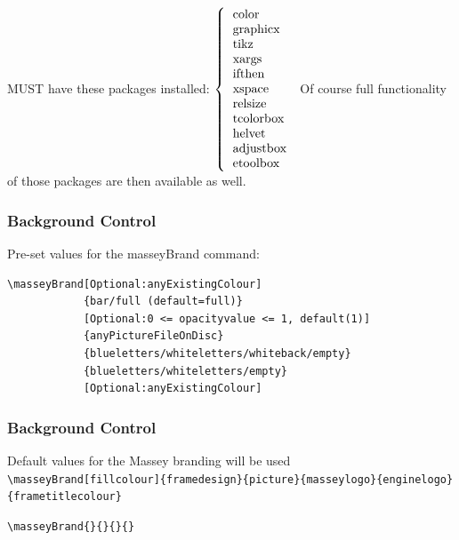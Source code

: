\documentclass[10pt,aspectratio=169]{beamer}
\begin{document}
\begin{frame}[fragile]

MUST have these packages installed: $\left\{
\begin{tabular}{l}
color\\
graphicx\\
tikz\\
xargs\\
ifthen\\
xspace\\
relsize\\
tcolorbox\\
helvet\\
adjustbox\\
etoolbox\\
\end{tabular}\right.$
\vfill
Of course full functionality of those packages are then available as well.
\vfill\null
\end{frame}



\masseyBrand{}{}{}{}

\begin{frame}[fragile]
\frametitle{Background Control}
Pre-set values for the masseyBrand command:
{\footnotesize
\begin{verbatim}
\masseyBrand[Optional:anyExistingColour]
            {bar/full (default=full)}
            [Optional:0 <= opacityvalue <= 1, default(1)]
            {anyPictureFileOnDisc}
            {blueletters/whiteletters/whiteback/empty}
            {blueletters/whiteletters/empty}
            [Optional:anyExistingColour]
\end{verbatim}
}
\end{frame}


\begin{frame}[fragile]
\frametitle{Background Control}
Default values for the Massey branding will be used\\[2ex]
{\footnotesize
\verb|\masseyBrand[fillcolour]{framedesign}{picture}{masseylogo}{enginelogo}{frametitlecolour}|}

\verb|\masseyBrand{}{}{}{}|
\end{frame}

\masseyBrand[masseyTasman]{}{}{}{}
\end{document}
